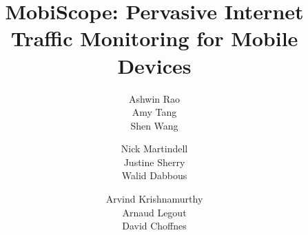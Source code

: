 \documentclass{sig-alternate-10pt}
\title{MobiScope: Pervasive Internet Traffic Monitoring for Mobile Devices}
\author{
\alignauthor
Ashwin Rao\\
\affaddr{INRIA}
\alignauthor
Amy Tang\\
\affaddr{UC Berkeley}
\alignauthor        
Shen Wang\\
\affaddr{University of Washington}
\and
\alignauthor
Nick Martindell\\
\affaddr{University of Washington}
\alignauthor
Justine Sherry\\
\affaddr{UC Berkeley}
\alignauthor
Walid Dabbous\\
\affaddr{INRIA}
\and
\alignauthor
Arvind Krishnamurthy\\
\affaddr{University of Washington}
\alignauthor 
Arnaud Legout\\
\affaddr{INRIA}
\alignauthor
David Choffnes\\
\affaddr{Northeastern University}
}
\date{}
\begin{document}
	
\maketitle











%









%
%
{\footnotesize


}
\end{document}
